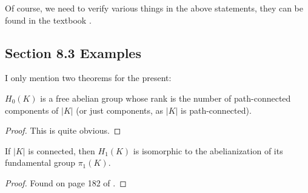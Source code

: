Of course, we need to verify various things in the above statements,
they can be found in the textbook \cite{book}.

\subsection{Section 8.3 Examples}
\label{sec:Section 8.3 Examples}

I only mention two theorems for the present:

\begin{thm}
    $H_0(K)$ is a free abelian group whose rank is the number of
    path-connected components of $|K|$ (or just components, as $|K|$
    is path-connected).
\end{thm}
\begin{proof}
    This is quite obvious.
\end{proof}

\begin{thm}
    If $|K|$ is connected, then $H_1(K)$ is isomorphic to the
    abelianization of its fundamental group $\pi_1(K)$.
\end{thm}
\begin{proof}
    Found on page 182 of \cite{book}.
\end{proof}

